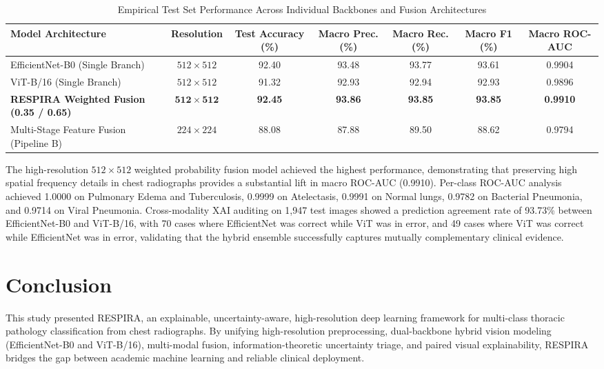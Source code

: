 \documentclass[journal]{IEEEtran}
\begin{document}
\begin{table}[!t]
\renewcommand{\arraystretch}{1.2}
\caption{Empirical Test Set Performance Across Individual Backbones and Fusion Architectures}
\label{tab:empirical_results}
\centering
\begin{tabular}{lcccccc}
\toprule
\textbf{Model Architecture} & \textbf{Resolution} & \textbf{Test Accuracy (\%)} & \textbf{Macro Prec. (\%)} & \textbf{Macro Rec. (\%)} & \textbf{Macro F1 (\%)} & \textbf{Macro ROC-AUC} \\
\midrule
EfficientNet-B0 (Single Branch) & $512 \times 512$ & 92.40 & 93.48 & 93.77 & 93.61 & 0.9904 \\
ViT-B/16 (Single Branch) & $512 \times 512$ & 91.32 & 92.93 & 92.94 & 92.93 & 0.9896 \\
\textbf{RESPIRA Weighted Fusion (0.35 / 0.65)} & $\mathbf{512 \times 512}$ & \textbf{92.45} & \textbf{93.86} & \textbf{93.85} & \textbf{93.85} & \textbf{0.9910} \\
Multi-Stage Feature Fusion (Pipeline B) & $224 \times 224$ & 88.08 & 87.88 & 89.50 & 88.62 & 0.9794 \\
\bottomrule
\end{tabular}
\end{table}

The high-resolution $512 \times 512$ weighted probability fusion model achieved the highest performance, demonstrating that preserving high spatial frequency details in chest radiographs provides a substantial lift in macro ROC-AUC (0.9910). Per-class ROC-AUC analysis achieved 1.0000 on Pulmonary Edema and Tuberculosis, 0.9999 on Atelectasis, 0.9991 on Normal lungs, 0.9782 on Bacterial Pneumonia, and 0.9714 on Viral Pneumonia. Cross-modality XAI auditing on 1,947 test images showed a prediction agreement rate of 93.73\% between EfficientNet-B0 and ViT-B/16, with 70 cases where EfficientNet was correct while ViT was in error, and 49 cases where ViT was correct while EfficientNet was in error, validating that the hybrid ensemble successfully captures mutually complementary clinical evidence.

\section{Conclusion}
\label{sec:conclusion}
This study presented RESPIRA, an explainable, uncertainty-aware, high-resolution deep learning framework for multi-class thoracic pathology classification from chest radiographs. By unifying high-resolution preprocessing, dual-backbone hybrid vision modeling (EfficientNet-B0 and ViT-B/16), multi-modal fusion, information-theoretic uncertainty triage, and paired visual explainability, RESPIRA bridges the gap between academic machine learning and reliable clinical deployment.
\end{document}
